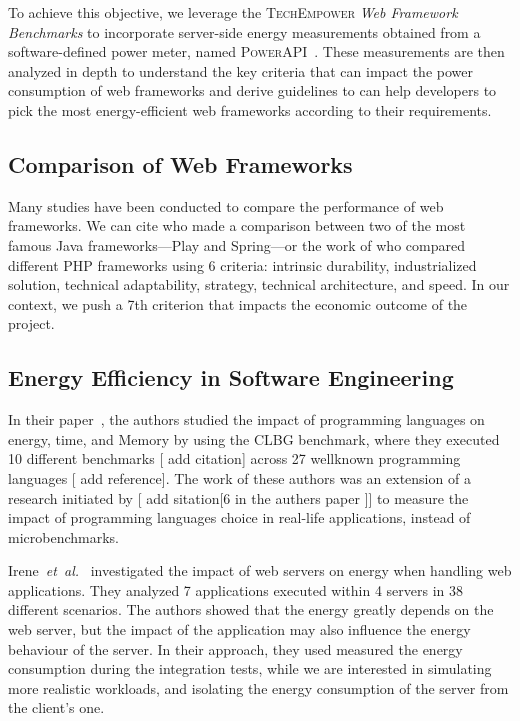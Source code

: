 To achieve this objective, we leverage the \textsc{TechEmpower} \emph{Web Framework Benchmarks} to incorporate server-side energy measurements obtained from a software-defined power meter, named \textsc{PowerAPI}~\cite{}.
These measurements are then analyzed in depth to understand the key criteria that can impact the power consumption of web frameworks and derive guidelines to can help developers to pick the most energy-efficient web frameworks according to their requirements.


\subsection{Comparison of Web Frameworks}
Many studies have been conducted to compare the performance of web frameworks.
We can cite \cite{gajewski_analysis_2019} who made a comparison between two of the most famous Java frameworks---Play and Spring---or the work of \cite{benmoussa_new_2019} who compared different PHP frameworks using 6 criteria: intrinsic durability, industrialized solution, technical adaptability, strategy, technical architecture, and speed.
In our context, we push a 7th criterion that impacts the economic outcome of the project.

\subsection{Energy Efficiency in Software Engineering}
In their paper~\cite{pereira_energy_2017}, the authors studied the impact of programming languages on energy, time, and Memory by using the CLBG benchmark, where they executed 10 different benchmarks [ add citation] across 27 wellknown programming languages [ add reference].
The work of these authors was an extension of a research initiated by [ add sitation[6 in the authers paper ]] to measure the impact of programming languages choice in real-life applications, instead of microbenchmarks.


Irene~\emph{et~al.}~\cite{manotas_investigating_2013} investigated the impact of web servers on energy when handling web applications.
They analyzed 7 applications executed within 4 servers in 38 different scenarios.
The authors showed that the energy greatly depends on the web server, but the impact of the application may also influence the energy behaviour of the server.
In their approach, they used measured the energy consumption during the integration tests, while we are interested in simulating more realistic workloads, and isolating the energy consumption of the server from the client's one.


